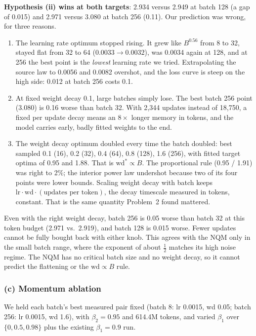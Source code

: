 \documentclass[10pt,letterpaper]{article}
\newcommand{\wds}{\ensuremath{\mathrm{wd}^{*}}}
\begin{document}
\textbf{Hypothesis (ii) wins at both targets}: 2.934 versus 2.949 at batch 128 (a gap of 0.015) and 2.971 versus 3.080 at batch 256 (0.11). Our prediction was wrong, for three reasons.
\begin{enumerate}
\item The learning rate optimum stopped rising. It grew like $B^{0.56}$ from 8 to 32, stayed flat from 32 to 64 ($0.0033\to0.0032$), was 0.0034 again at 128, and at 256 the best point is the \emph{lowest} learning rate we tried. Extrapolating the source law to 0.0056 and 0.0082 overshot, and the loss curve is steep on the high side: 0.012 at batch 256 costs 0.1.
\item At fixed weight decay 0.1, large batches simply lose. The best batch 256 point (3.080) is 0.16 worse than batch 32. With 2{,}344 updates instead of 18{,}750, a fixed per update decay means an $8\times$ longer memory in tokens, and the model carries early, badly fitted weights to the end.
\item The weight decay optimum doubled every time the batch doubled: best sampled 0.1 (16), 0.2 (32), 0.4 (64), 0.8 (128), 1.6 (256), with fitted target optima of 0.95 and 1.88. That is $\wds\propto B$. The proportional rule (0.95 / 1.91) was right to 2\%; the interior power law undershot because two of its four points were lower bounds. Scaling weight decay with batch keeps $\mathrm{lr}\cdot\mathrm{wd}\cdot(\text{updates per token})$, the decay timescale measured in tokens, constant. That is the same quantity Problem~2 found mattered.
\end{enumerate}

Even with the right weight decay, batch 256 is 0.05 worse than batch 32 at this token budget (2.971 vs.\ 2.919), and batch 128 is 0.015 worse. Fewer updates cannot be fully bought back with either knob. This agrees with the NQM only in the small batch range, where the exponent of about $\tfrac12$ matches its high noise regime. The NQM has no critical batch size and no weight decay, so it cannot predict the flattening or the $\mathrm{wd}\propto B$ rule.

\subsubsection*{(c) Momentum ablation}

We held each batch's best measured pair fixed (batch 8: lr 0.0015, wd 0.05; batch 256: lr 0.0015, wd 1.6), with $\beta_2=0.95$ and 614.4M tokens, and varied $\beta_1$ over $\{0,0.5,0.98\}$ plus the existing $\beta_1=0.9$ run.
\end{document}
